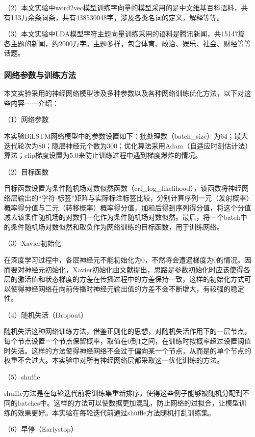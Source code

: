 \documentclass[winfonts,master,oneside,nobackinfo]{njuthesis}
\begin{document}
（2）本文实验中word2vec模型训练字向量的模型采用的是中文维基百科语料，共有133万余条词条，共有438530048字，涉及各类名词的定义，解释等等。

（3）本文实验中LDA模型字符主题向量训练采用的语料是腾讯新闻，共15147篇各主题的新闻，约2000万字。主题多样，包含体育、政治、娱乐、社会、财经等等话题。

\subsubsection{网络参数与训练方法}

本文实验采用的神经网络模型涉及多种参数以及各种网络训练优化方法，以下对这些内容一一介绍：

（1）网络参数

本实验BiLSTM网络模型中的参数设置如下：批处理数（batch\_size）为64；最大迭代轮次为80；隐层神经元个数为300；优化算法采用Adam\cite{Adam}（自适应时刻估计法）算法；clip梯度设置为5.0来防止训练过程中遇到梯度爆炸的情况。

（2）目标函数

目标函数设置为条件随机场对数似然函数（crf\_log\_likelihood），该函数将神经网络层输出的“字符-标签”矩阵与实际标注标签比较，分别计算序列一元（发射概率）概率得分值与二元（转移概率）概率得分值，加和后得到序列得分值，将这个分值减去该条件随机场的对数归一化作为条件随机场对数似然。最后，将一个batch中的条件随机场对数似然和取负作为网络训练的目标函数，用于训练网络。

（3）Xavier初始化

在深度学习过程中，各层神经元不能初始化为0，不然将会遭遇梯度为0的情况。因而要对神经元初始化，Xavier初始化由文献\cite{Xavier}提出，思路是参数初始化时应该使得各层的激活值和状态梯度的方差在传播过程中的方差保持一致，这样的初始化方式可以使得神经网络在向前传播时神经元输出值的方差不会不断增大，有较强的稳定性。

（4）随机失活（Dropout）

随机失活这种网络训练方法，借鉴正则化的思想，对随机失活作用下的一层节点，每个节点设置一个节点保留概率，取值在0到1之间，在训练时按概率超过设置阈值时失活。这样的方法使得神经网络不会过于偏向某一个节点，从而是的单个节点的权重不会过大。本实验中对所有神经网络层都采取这一优化训练的方法。

（5）shuffle

shuffle方法是在每轮迭代前将训练集重新排序，使得这些例子能够被随机分配到不同的batches中。这样的方法可以使数据更加混乱，防止网络的过拟合，让模型训练的效果更好。本实验在每轮迭代前通过shuffle方法随机打乱训练集。

（6）早停（Earlystop）
\end{document}
